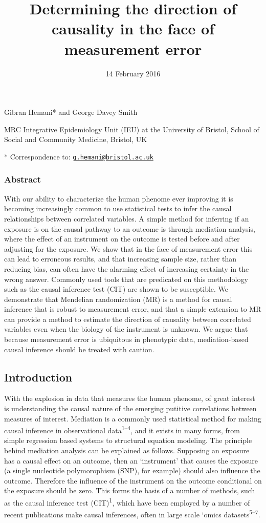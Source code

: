 \documentclass[]{article}
\title{Determining the direction of causality in the face of measurement error}
\author{}
\date{14 February 2016}
\begin{document}
\maketitle


Gibran Hemani* and George Davey Smith

MRC Integrative Epidemiology Unit (IEU) at the University of Bristol,
School of Social and Community Medicine, Bristol, UK

* Correspondence to:
\href{mailto:g.hemani@bristol.ac.uk}{\nolinkurl{g.hemani@bristol.ac.uk}}

\subsubsection{Abstract}\label{abstract}

With our ability to characterize the human phenome ever improving it is
becoming increasingly common to use statistical tests to infer the
causal relationships between correlated variables. A simple method for
inferring if an exposure is on the causal pathway to an outcome is
through mediation analysis, where the effect of an instrument on the
outcome is tested before and after adjusting for the exposure. We show
that in the face of measurement error this can lead to erroneous
results, and that increasing sample size, rather than reducing bias, can
often have the alarming effect of increasing certainty in the wrong
answer. Commonly used tools that are predicated on this methodology such
as the causal inference test (CIT) are shown to be susceptible. We
demonstrate that Mendelian randomization (MR) is a method for causal
inference that is robust to measurement error, and that a simple
extension to MR can provide a method to estimate the direction of
causality between correlated variables even when the biology of the
instrument is unknown. We argue that because measurement error is
ubiquitous in phenotypic data, mediation-based causal inference should
be treated with caution.

\subsection{Introduction}\label{introduction}

With the explosion in data that measures the human phenome, of great
interest is understanding the causal nature of the emerging putitive
correlations between measures of interest. Mediation is a commonly used
statistical method for making causal inference in observational
data\textsuperscript{1--4}, and it exists in many forms, from simple
regression based systems to structural equation modeling. The principle
behind mediation analysis can be explained as follows. Supposing an
exposure has a causal effect on an outcome, then an `instrument' that
causes the exposure (a single nucleotide polymorophism (SNP), for
example) should also influence the outcome. Therefore the influence of
the instrument on the outcome conditional on the exposure should be
zero. This forms the basis of a number of methods, such as the causal
inference test (CIT)\textsuperscript{1}, which have been employed by a
number of recent publications make causal inferences, often in large
scale `omics datasets\textsuperscript{5--7}.
\end{document}
